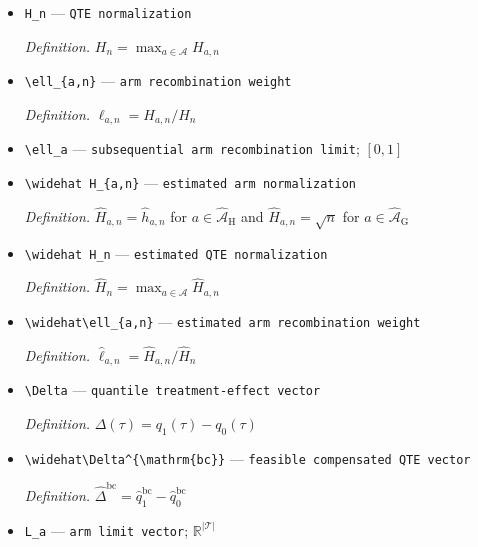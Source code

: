 \documentclass{article}
\begin{document}
\begin{itemize}
  \item \texttt{H\_\allowbreak{}n} --- \texttt{QTE normalization}
  \par\smallskip\noindent\emph{Definition.} \(H_n=\max_{a\in\mathcal A}H_{a,n}\)
  \item \texttt{\textbackslash{}\allowbreak{}ell\_\allowbreak{}\{a,\allowbreak{}n\}\allowbreak{}} --- \texttt{arm recombination weight}
  \par\smallskip\noindent\emph{Definition.} \(\ell_{a,n}=H_{a,n}/H_n\)
  \item \texttt{\textbackslash{}\allowbreak{}ell\_\allowbreak{}a} --- \texttt{subsequential arm recombination limit}; \([0,1]\)
  \item \texttt{\textbackslash{}\allowbreak{}widehat H\_\allowbreak{}\{a,\allowbreak{}n\}\allowbreak{}} --- \texttt{estimated arm normalization}
  \par\smallskip\noindent\emph{Definition.} \(\widehat H_{a,n}=\widehat h_{a,n}\) for \(a\in\widehat{\mathcal A}_{\mathrm H}\) and \(\widehat H_{a,n}=\sqrt n\) for \(a\in\widehat{\mathcal A}_{\mathrm G}\)
  \item \texttt{\textbackslash{}\allowbreak{}widehat H\_\allowbreak{}n} --- \texttt{estimated QTE normalization}
  \par\smallskip\noindent\emph{Definition.} \(\widehat H_n=\max_{a\in\mathcal A}\widehat H_{a,n}\)
  \item \texttt{\textbackslash{}\allowbreak{}widehat\textbackslash{}\allowbreak{}ell\_\allowbreak{}\{a,\allowbreak{}n\}\allowbreak{}} --- \texttt{estimated arm recombination weight}
  \par\smallskip\noindent\emph{Definition.} \(\widehat\ell_{a,n}=\widehat H_{a,n}/\widehat H_n\)
  \item \texttt{\textbackslash{}\allowbreak{}Delta} --- \texttt{quantile treatment-\allowbreak{}effect vector}
  \par\smallskip\noindent\emph{Definition.} \(\Delta(\tau)=q_1(\tau)-q_0(\tau)\)
  \item \texttt{\textbackslash{}\allowbreak{}widehat\textbackslash{}\allowbreak{}Delta\textasciicircum{}\{\textbackslash{}\allowbreak{}mathrm\{bc\}\allowbreak{}\}\allowbreak{}} --- \texttt{feasible compensated QTE vector}
  \par\smallskip\noindent\emph{Definition.} \(\widehat\Delta^{\mathrm{bc}}=\widehat q_1^{\mathrm{bc}}-\widehat q_0^{\mathrm{bc}}\)
  \item \texttt{L\_\allowbreak{}a} --- \texttt{arm limit vector}; \(\mathbb R^{|\mathcal T|}\)

\end{itemize}
\end{document}
